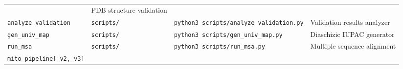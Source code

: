 \begin{longtable}[]{@{}llll@{}}
\begin{minipage}[t]{0.19\columnwidth}
\end{minipage} & \begin{minipage}[t]{0.28\columnwidth}\raggedright
PDB structure validation\strut
\end{minipage}\tabularnewline
\begin{minipage}[t]{0.17\columnwidth}\raggedright
\texttt{analyze\_validation}\strut
\end{minipage} & \begin{minipage}[t]{0.24\columnwidth}\raggedright
\texttt{scripts/}\strut
\end{minipage} & \begin{minipage}[t]{0.19\columnwidth}\raggedright
\texttt{python3\ scripts/analyze\_validation.py}\strut
\end{minipage} & \begin{minipage}[t]{0.28\columnwidth}\raggedright
Validation results analyzer\strut
\end{minipage}\tabularnewline
\begin{minipage}[t]{0.17\columnwidth}\raggedright
\texttt{gen\_univ\_map}\strut
\end{minipage} & \begin{minipage}[t]{0.24\columnwidth}\raggedright
\texttt{scripts/}\strut
\end{minipage} & \begin{minipage}[t]{0.19\columnwidth}\raggedright
\texttt{python3\ scripts/gen\_univ\_map.py}\strut
\end{minipage} & \begin{minipage}[t]{0.28\columnwidth}\raggedright
Diaschizic IUPAC generator\strut
\end{minipage}\tabularnewline
\begin{minipage}[t]{0.17\columnwidth}\raggedright
\texttt{run\_msa}\strut
\end{minipage} & \begin{minipage}[t]{0.24\columnwidth}\raggedright
\texttt{scripts/}\strut
\end{minipage} & \begin{minipage}[t]{0.19\columnwidth}\raggedright
\texttt{python3\ scripts/run\_msa.py}\strut
\end{minipage} & \begin{minipage}[t]{0.28\columnwidth}\raggedright
Multiple sequence alignment\strut
\end{minipage}\tabularnewline
\begin{minipage}[t]{0.17\columnwidth}\raggedright
\texttt{mito\_pipeline{[}\_v2,\_v3{]}}\strut
\end{minipage} & \begin{minipage}[t]{0.24\columnwidth}\raggedright

\end{minipage}
\end{longtable}
